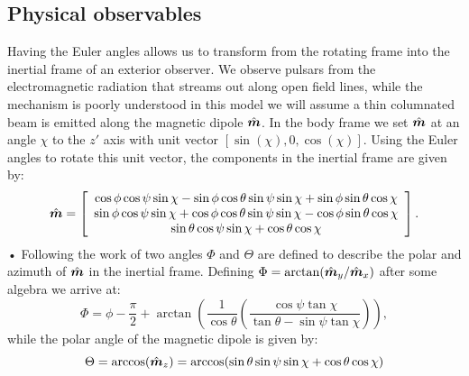 \documentclass[11pt]{article}
\numberwithin{equation}{section}
\numberwithin{figure}{section}
\numberwithin{table}{section}
\begin{document}
\subsection{Physical observables}
Having the Euler angles allows us to transform from the rotating frame into the inertial frame of an exterior observer. We observe pulsars from the electromagnetic radiation that streams out along open field lines, while the mechanism is poorly understood in this model we will assume a thin columnated beam is emitted along the magnetic dipole $\hat{\boldsymbol{m}}$. %
In the body frame we set $\hat{\boldsymbol{m}}$ at an angle $\chi$ to the $z'$ axis with unit vector $[\sin(\chi), 0, \cos(\chi)]$. Using the Euler angles to rotate this unit vector, the components in the inertial frame are given by:
\begin{equation}
\hat{\boldsymbol{m}} = 
\left[\begin{array}{c}
\cos\phi\cos\psi\sin\chi - \sin\phi \cos \theta \sin \psi \sin \chi + \sin \phi \sin \theta \cos \chi \\
\sin\phi\cos\psi\sin\chi + \cos\phi \cos \theta \sin \psi \sin \chi - \cos \phi \sin \theta \cos \chi \\
\sin\theta \cos\psi \sin\chi + \cos\theta \cos \chi
\end{array}\right].
\label{eqn:m inertial}
\end{equation}•
Following the work of \citet{Jones2001} two angles $\Phi$ and $\Theta$ are defined to describe the polar and azimuth of $\hat{\boldsymbol{m}}$ in the inertial frame. 
Defining $\Phi = \arctan(\hat{\boldsymbol{m}}_{y} / \hat{\boldsymbol{m}}_{x})$ after some algebra we arrive at: 
\begin{equation}
\Phi = \phi - \frac{\pi}{2} + \arctan\left(\frac{1}{\cos\theta}\left(\frac{\cos\psi \tan \chi}{\tan\theta - \sin \psi \tan\chi }\right)\right),
\label{eqn:Phi}
\end{equation}
while the polar angle of the magnetic dipole is given by:
\begin{equation}
\Theta = \arccos(\hat{\boldsymbol{m}}_{z}) = \arccos(\sin \theta \sin \psi \sin \chi + \cos \theta \cos \chi )
\label{eqn:Theta}
\end{equation}
\end{document}
